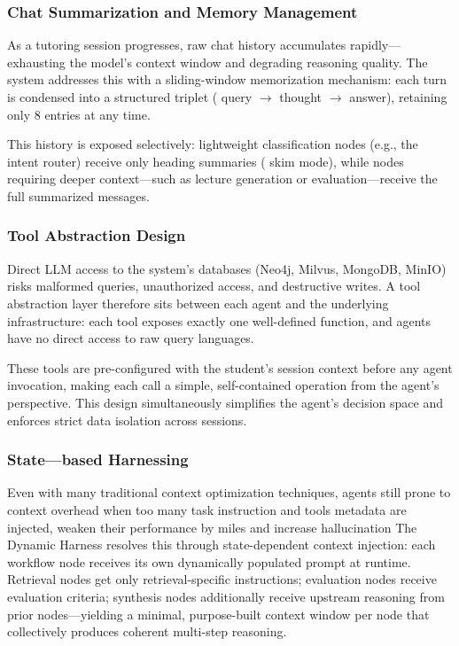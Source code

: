 \subsubsection*{Chat Summarization and Memory Management}

As a tutoring session progresses, raw chat history accumulates rapidly---exhausting the model's context window and degrading reasoning quality. The system addresses this with a sliding-window memorization mechanism: each turn is condensed into a structured triplet ( {query} $\rightarrow$  {thought} $\rightarrow$  {answer}), retaining only 8 entries at any time.

This history is exposed selectively: lightweight classification nodes (e.g., the intent router) receive only heading summaries ( {skim} mode), while nodes requiring deeper context---such as lecture generation or evaluation---receive the full summarized messages.

\subsubsection{Tool Abstraction Design}

Direct LLM access to the system's databases (Neo4j, Milvus, MongoDB, MinIO) risks malformed queries, unauthorized access, and destructive writes. A tool abstraction layer therefore sits between each agent and the underlying infrastructure: each tool exposes exactly one well-defined function, and agents have no direct access to raw query languages.

These tools are pre-configured with the student's session context before any agent invocation, making each call a simple, self-contained operation from the agent's perspective. This design simultaneously simplifies the agent's decision space and enforces strict data isolation across sessions.

\subsubsection{State---based Harnessing}

Even with many traditional context optimization techniques, agents still prone to context overhead when too many task instruction and tools metadata are injected, 
weaken their performance by miles and increase hallucination
The Dynamic Harness resolves this through state-dependent context injection: each workflow node receives its own dynamically populated prompt at runtime. 
Retrieval nodes get only retrieval-specific 
instructions; evaluation nodes receive evaluation criteria; synthesis nodes additionally receive upstream reasoning from prior nodes---yielding a minimal, 
purpose-built context window per node that collectively produces coherent multi-step reasoning.

